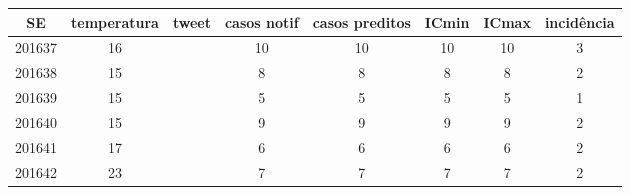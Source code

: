 \begin{tabular}{c|ccccccc}
  \hline
SE & temperatura & tweet & casos notif & casos preditos & ICmin & ICmax & incidência \\ 
  \hline
201637 & 16 &  & 10 & 10 & 10 & 10 & 3 \\ 
  201638 & 15 &  & 8 & 8 & 8 & 8 & 2 \\ 
  201639 & 15 &  & 5 & 5 & 5 & 5 & 1 \\ 
  201640 & 15 &  & 9 & 9 & 9 & 9 & 2 \\ 
  201641 & 17 &  & 6 & 6 & 6 & 6 & 2 \\ 
  201642 & 23 &  & 7 & 7 & 7 & 7 & 2 \\ 
   \hline
\end{tabular}
